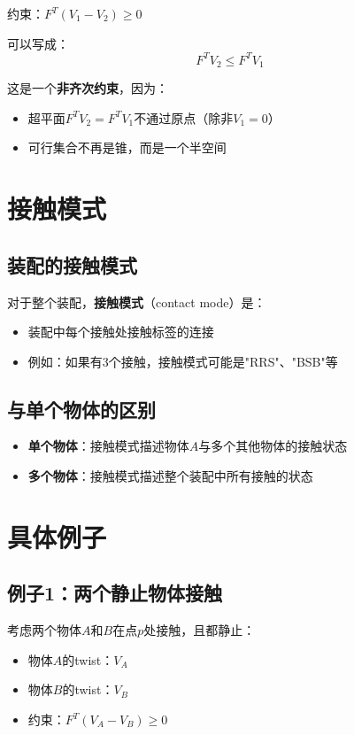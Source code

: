 \documentclass[12pt,a4paper]{article}
\begin{document}
约束：$F^T (V_1 - V_2) \geq 0$

可以写成：
\begin{equation}
F^T V_2 \leq F^T V_1
\end{equation}

这是一个\textbf{非齐次约束}，因为：
\begin{itemize}
\item 超平面$F^T V_2 = F^T V_1$不通过原点（除非$V_1 = 0$）
\item 可行集合不再是锥，而是一个半空间
\end{itemize}

\section{接触模式}

\subsection{装配的接触模式}

对于整个装配，\textbf{接触模式}（contact mode）是：
\begin{itemize}
\item 装配中每个接触处接触标签的连接
\item 例如：如果有3个接触，接触模式可能是"RRS"、"BSB"等
\end{itemize}

\subsection{与单个物体的区别}

\begin{itemize}
\item \textbf{单个物体}：接触模式描述物体$A$与多个其他物体的接触状态
\item \textbf{多个物体}：接触模式描述整个装配中所有接触的状态
\end{itemize}

\section{具体例子}

\subsection{例子1：两个静止物体接触}

考虑两个物体$A$和$B$在点$p$处接触，且都静止：

\begin{itemize}
\item 物体$A$的twist：$V_A$
\item 物体$B$的twist：$V_B$
\item 约束：$F^T (V_A - V_B) \geq 0$
\end{itemize}
\end{document}
